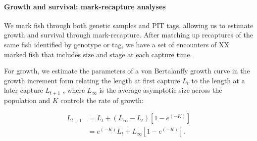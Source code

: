 \documentclass[12pt, oneside]{article}   	%
\begin{document}

\paragraph*{Growth and survival: mark-recapture analyses}

We mark fish through both genetic samples and PIT tags, allowing us to estimate growth and survival through mark-recapture. After matching up recaptures of the same fish identified by genotype or tag, we have a set of encounters of XX marked fish that includes size and stage at each capture time.

For growth, we estimate the parameters of a von Bertalanffy growth curve \citep{fabens1965properties} in the growth increment form relating the length at first capture $L_t$ to the length at a later capture $L_{t+1}$ \citep{hart2009estimating}, where $L_\infty$ is the average asymptotic size across the population and $K$ controls the rate of growth: %

\begin{equation} \label{EQN_VBL} 
\begin{split}
L_{t+1} & = L_t + (L_\infty - L_t)[1 - e^{(-K)}] \\
 & = e^{(-K)}L_t + L_\infty[1 - e^{(-K)}].
\end{split}
\end{equation}
\end{document}

